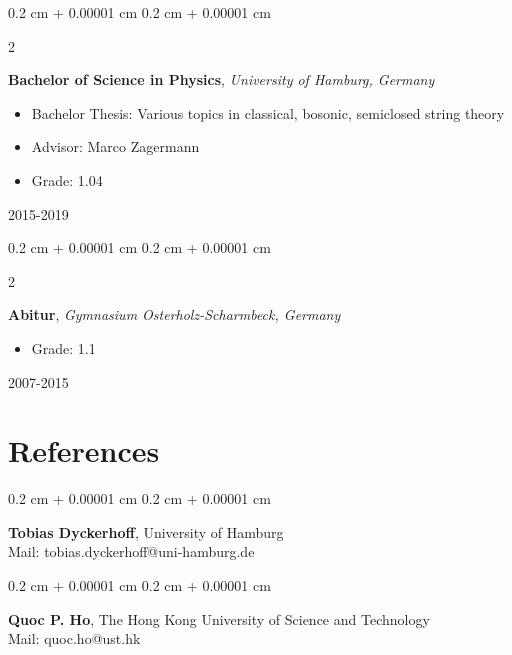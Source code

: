 \documentclass[10pt, letterpaper]{article}
\newenvironment{highlights}{
    \begin{itemize}[
        topsep=0.10 cm,
        parsep=0.10 cm,
        partopsep=0pt,
        itemsep=0pt,
        leftmargin=0.4 cm + 10pt
    ]
}{
    \end{itemize}
} %
\newenvironment{onecolentry}{
    \begin{adjustwidth}{
        0.2 cm + 0.00001 cm
    }{
        0.2 cm + 0.00001 cm
    }
}{
    \end{adjustwidth}
} %
\newenvironment{twocolentry}[2][]{
    \onecolentry
    \def\secondColumn{#2}
    \setcolumnwidth{\fill, 4.5 cm}
    \begin{paracol}{2}
}{
    \switchcolumn \raggedleft \secondColumn
    \end{paracol}
    \endonecolentry
} %
\begin{document}
        \vspace{0.2 cm}

        \begin{twocolentry}{

        2015-2019 
            
        }
            \textbf{Bachelor of Science in Physics}, \textit{University of Hamburg, Germany}
            \begin{highlights}
                \item Bachelor Thesis: Various topics in classical, bosonic, semiclosed string theory 
                \item Advisor: Marco Zagermann 
                \item Grade: 1.04
            \end{highlights}
        \end{twocolentry}


        \vspace{0.2 cm}

        \begin{twocolentry}{

    2007-2015
           
        }
            \textbf{Abitur}, \textit{Gymnasium Osterholz-Scharmbeck, Germany}
            \begin{highlights}
                \item Grade: 1.1
            \end{highlights}
        \end{twocolentry}

\section{References}

\begin{onecolentry}
                \textbf{Tobias Dyckerhoff}, University of Hamburg \\
                Mail: tobias.dyckerhoff@uni-hamburg.de 
\end{onecolentry}

\vspace{0.2cm}

\begin{onecolentry}
    \textbf{Quoc P. Ho}, The Hong Kong University of Science and Technology \\
    Mail:  quoc.ho@ust.hk
\end{onecolentry}

\vspace{0.2cm}
\end{document}
